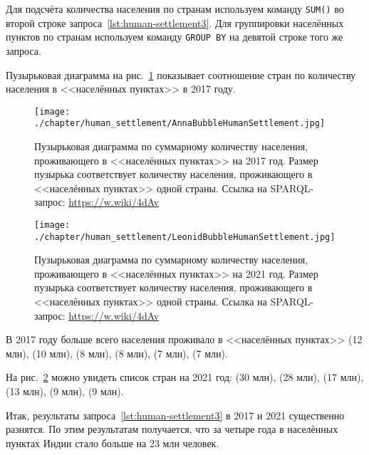 Для подсчёта количества населения по странам 
используем команду \lstinline|SUM()| во второй строке запроса~\ref{lst:human-settlement3}. 
Для группировки населённых пунктов по странам 
используем команду \lstinline|GROUP BY| на девятой строке того же запроса.

Пузырьковая диаграмма на рис.~\ref{fig:human-settlement-1} 
показывает соотношение стран по количеству населения в <<населённых пунктах>> в 2017 году.

\begin{figure}
\centering
	\texttt{[image: ./chapter/human\_settlement/AnnaBubbleHumanSettlement.jpg]}
	\label{fig:human-settlement-1}
    \caption[Пузырьковая диаграмма  по суммарному количеству населения в населённых пунктах, 2017.]{Пузырьковая диаграмма  по суммарному количеству населения, проживающего в <<населённых пунктах>> на 2017 год. Размер пузырька соответствует количеству населения, проживающего в <<населённых пунктах>> одной страны. Ссылка на SPARQL-запрос: \href{https://w.wiki/4dAv}{https://w.wiki/4dAv}}
\end{figure}

\begin{figure}
\centering
	\texttt{[image: ./chapter/human\_settlement/LeonidBubbleHumanSettlement.jpg]}
	\label{fig:human-settlement-2}
	\caption[Пузырьковая диаграмма  по суммарному количеству населения в населённых пунктах, 2021.]{Пузырьковая диаграмма  по суммарному количеству населения, проживающего в <<населённых пунктах>> на 2021 год. Размер пузырька соответствует количеству населения, проживающего в <<населённых пунктах>> одной страны. Ссылка на SPARQL-запрос: \href{https://w.wiki/4dAv}{https://w.wiki/4dAv}}
\end{figure}

В 2017 году больше всего населения проживало в <<населённых пунктах>> 
 (\num{12} млн), 
 (\num{10} млн), 
 (\num{8} млн), 
 (\num{8} млн), 
 (\num{7} млн), 
 (\num{7} млн). 

На рис.~\ref{fig:human-settlement-2} можно увидеть список стран на 2021 год: 
 (\num{30} млн), 
 (\num{28} млн), 
 (\num{17} млн), 
 (\num{13} млн), 
 (\num{9} млн), 
 (\num{9} млн). 

Итак, результаты запроса~\ref{lst:human-settlement3} в 2017 и 2021 существенно разнятся. 
По этим результатам получается, что за четыре года 
в населённых пунктах Индии стало больше на 23 млн человек. 


